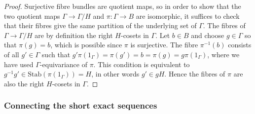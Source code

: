 \documentclass[AHL,Unicode,published]{cedram}
\newcommand{\rStab}{\mathrm{Stab}}
\begin{document}
\begin{proof}
Surjective fibre bundles are quotient maps, so in order to show that the two quotient maps $\Gamma \to \Gamma/H$ and $\pi \colon \Gamma \to B$ are isomorphic, it suffices to check that their fibres give the same partition of the underlying set of $\Gamma$. The fibres of $\Gamma \to \Gamma/H$ are by definition the right $H$-cosets in $\Gamma$. Let $b \in B$ and choose $g \in \Gamma$ so that $\pi(g) = b$, which is possible since $\pi$ is surjective. The fibre $\pi^{-1}(b)$ consists of all $g' \in \Gamma$ such that $g' \pi(1_\Gamma) = \pi(g') = b = \pi(g) = g \pi(1_\Gamma)$, where we have used $\Gamma$-equivariance of $\pi$. This condition is equivalent to $g^{-1}g' \in \rStab(\pi(1_\Gamma)) = H$, in other words $g' \in gH$. Hence the fibres of $\pi$ are also the right $H$-cosets in $\Gamma$.
\end{proof}


\subsubsection{Connecting the short exact sequences}\label{sec:map_of_ses}
\end{document}
